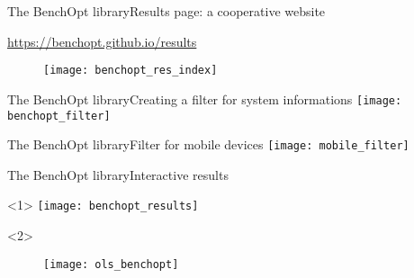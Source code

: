 \documentclass[10pt,aspectratio=43]{beamer}
\begin{document}
\appendix
\begin{frame}[noframenumbering]{The BenchOpt library}{Results page:
    a cooperative website}

\begin{center}
    \url{https://benchopt.github.io/results}
\end{center}
\begin{figure}[h]
    \centering
    \texttt{[image: benchopt\_res\_index]}
\end{figure}
\end{frame}
\begin{frame}[noframenumbering]{The BenchOpt library}{Creating a filter for system informations}
\centering
\texttt{[image: benchopt\_filter]}
\end{frame}
\begin{frame}[noframenumbering]{The BenchOpt library}{Filter for mobile devices}
\centering
\texttt{[image: mobile\_filter]}
\end{frame}
\begin{frame}[noframenumbering]{The BenchOpt library}{Interactive results}
\begin{onlyenv}<1>
\centering
\texttt{[image: benchopt\_results]}
\end{onlyenv}
\begin{onlyenv}<2>
\begin{figure}
\centering
\texttt{[image: ols\_benchopt]}
\end{figure}
\end{onlyenv}
\end{frame}
\end{document}

